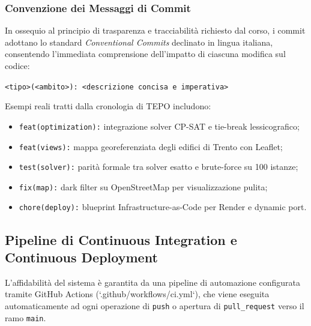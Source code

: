 \subsubsection{Convenzione dei Messaggi di Commit}
In ossequio al principio di trasparenza e tracciabilità richiesto dal corso, i commit adottano lo standard \emph{Conventional Commits} declinato in lingua italiana, consentendo l'immediata comprensione dell'impatto di ciascuna modifica sul codice:
\begin{center}
    \texttt{<tipo>(<ambito>): <descrizione concisa e imperativa>}
\end{center}
Esempi reali tratti dalla cronologia di TEPO includono:
\begin{itemize}[leftmargin=1.5em, itemsep=0.15em]
    \item \texttt{feat(optimization):} integrazione solver CP-SAT e tie-break lessicografico;
    \item \texttt{feat(views):} mappa georeferenziata degli edifici di Trento con Leaflet;
    \item \texttt{test(solver):} parità formale tra solver esatto e brute-force su 100 istanze;
    \item \texttt{fix(map):} dark filter su OpenStreetMap per visualizzazione pulita;
    \item \texttt{chore(deploy):} blueprint Infrastructure-as-Code per Render e dynamic port.
\end{itemize}

\subsection{Pipeline di Continuous Integration e Continuous Deployment}
L'affidabilità del sistema è garantita da una pipeline di automazione configurata tramite GitHub Actions (`.github/workflows/ci.yml`), che viene eseguita automaticamente ad ogni operazione di \texttt{push} o apertura di \texttt{pull\_request} verso il ramo \texttt{main}.

